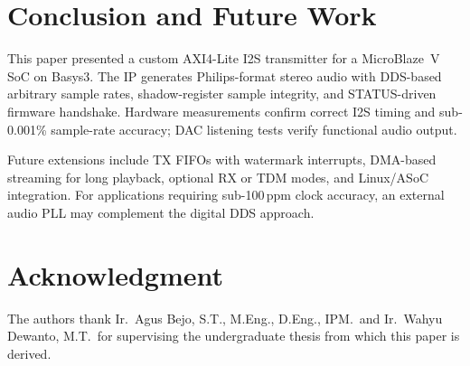 \section{Conclusion and Future Work}
\label{sec:conclusion}

This paper presented a custom AXI4-Lite I2S transmitter for a MicroBlaze~V SoC on Basys3.
The IP generates Philips-format stereo audio with DDS-based arbitrary sample rates, shadow-register sample integrity, and STATUS-driven firmware handshake.
Hardware measurements confirm correct I2S timing and sub-0.001\% sample-rate accuracy; DAC listening tests verify functional audio output.

Future extensions include TX FIFOs with watermark interrupts, DMA-based streaming for long playback, optional RX or TDM modes, and Linux/ASoC integration.
For applications requiring sub-100\,ppm clock accuracy, an external audio PLL may complement the digital DDS approach.

\section*{Acknowledgment}

The authors thank Ir.\ Agus Bejo, S.T., M.Eng., D.Eng., IPM.\ and Ir.\ Wahyu Dewanto, M.T.\ for supervising the undergraduate thesis from which this paper is derived.
